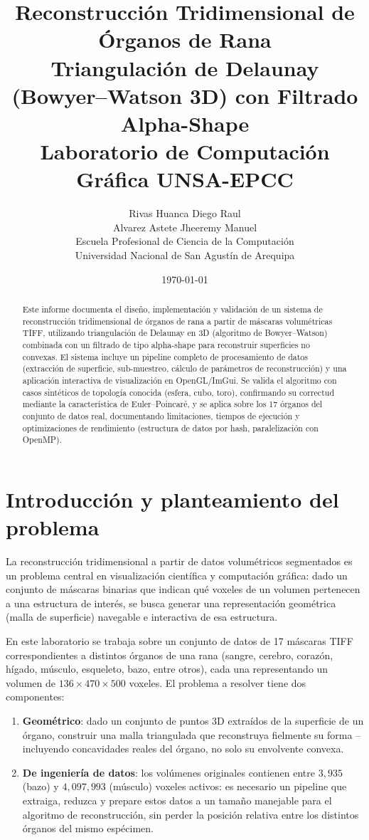 \documentclass[12pt,a4paper]{article}
\title{
    \textbf{Reconstrucción Tridimensional de Órganos de Rana} \\
    \large Triangulación de Delaunay (Bowyer--Watson 3D) con Filtrado Alpha-Shape \\
    \vspace{0.3cm}
    \normalsize Laboratorio de Computación Gráfica UNSA-EPCC
}
\author{
    Rivas Huanca Diego Raul \\
    Alvarez Astete Jheeremy Manuel \\
    \small Escuela Profesional de Ciencia de la Computación \\
    \small Universidad Nacional de San Agustín de Arequipa
}
\date{\today}
\begin{document}
\maketitle

\begin{abstract}
Este informe documenta el diseño, implementación y validación de un
sistema de reconstrucción tridimensional de órganos de rana a partir de
máscaras volumétricas TIFF, utilizando triangulación de Delaunay en 3D
(algoritmo de Bowyer--Watson) combinada con un filtrado de tipo
alpha-shape para reconstruir superficies no convexas. El sistema
incluye un pipeline completo de procesamiento de datos (extracción de
superficie, sub-muestreo, cálculo de parámetros de reconstrucción) y
una aplicación interactiva de visualización en OpenGL/ImGui. Se valida
el algoritmo con casos sintéticos de topología conocida (esfera, cubo,
toro), confirmando su correctud mediante la característica de
Euler--Poincaré, y se aplica sobre los 17 órganos del conjunto de datos
real, documentando limitaciones, tiempos de ejecución y optimizaciones
de rendimiento (estructura de datos por hash, paralelización con
OpenMP).
\end{abstract}

\newpage
\tableofcontents
\newpage

\section{Introducción y planteamiento del problema}

La reconstrucción tridimensional a partir de datos volumétricos
segmentados es un problema central en visualización científica y
computación gráfica: dado un conjunto de máscaras binarias que indican
qué voxeles de un volumen pertenecen a una estructura de interés, se
busca generar una representación geométrica (malla de superficie)
navegable e interactiva de esa estructura.

En este laboratorio se trabaja sobre un conjunto de datos de 17
máscaras TIFF correspondientes a distintos órganos de una rana (sangre,
cerebro, corazón, hígado, músculo, esqueleto, bazo, entre otros), cada
una representando un volumen de $136 \times 470 \times 500$ voxeles. El
problema a resolver tiene dos componentes:

\begin{enumerate}
    \item \textbf{Geométrico}: dado un conjunto de puntos 3D extraídos
    de la superficie de un órgano, construir una malla triangulada que
    reconstruya fielmente su forma -- incluyendo concavidades reales
    del órgano, no solo su envolvente convexa.
    \item \textbf{De ingeniería de datos}: los volúmenes originales
    contienen entre $3{,}935$ (bazo) y $4{,}097{,}993$ (músculo)
    voxeles activos: es necesario un pipeline que extraiga, reduzca y
    prepare estos datos a un tamaño manejable para el algoritmo de
    reconstrucción, sin perder la posición relativa entre los distintos
    órganos del mismo espécimen.
\end{enumerate}
\end{document}
